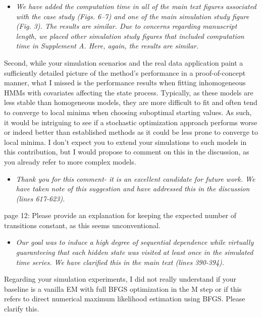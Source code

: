 \documentclass[11pt]{article}
\begin{document}
\begin{itemize}
    \item \textit{We have added the computation time in all of the main text figures associated with the case study (Figs. 6--7) and one of the main simulation study figure (Fig. 3). The results are similar. Due to concerns regarding manuscript length, we placed other simulation study figures that included computation time in Supplement A. Here, again, the results are similar.}
\end{itemize}

Second, while your simulation scenarios and the real data application paint a sufficiently detailed picture of the method’s performance in a proof-of-concept manner, what I missed is the performance results when fitting inhomogeneous HMMs with covariates affecting the state process. Typically, as these models are less stable than homogeneous models, they are more difficult to fit and often tend to converge to local minima when choosing suboptimal starting values. As such, it would be intriguing to see if a stochastic optimization approach performs worse or indeed better than established methods as it could be less prone to converge to local minima. I don’t expect you to extend your simulations to such models in this contribution, but I would propose to comment on this in the discussion, as you already refer to more complex models.

\begin{itemize}
    \item \textit{Thank you for this comment- it is an excellent candidate for future work. We have taken note of this suggestion and have addressed this in the discussion  (lines 617-623).}
\end{itemize}

page 12: Please provide an explanation for keeping the expected number of transitions constant, as this seems unconventional.

\begin{itemize}
    \item \textit{Our goal was to induce a high degree of sequential dependence while virtually guaranteeing that each hidden state was visited at least once in the simulated time series. We have clarified this in the main text (lines 390-394).}
\end{itemize}

Regarding your simulation experiments, I did not really understand if your baseline is a vanilla EM with full BFGS optimization in the M step or if this refers to direct numerical maximum likelihood estimation using BFGS. Please clarify this.
\end{document}
